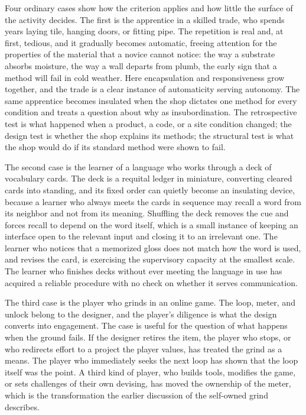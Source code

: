\documentclass[11pt]{article}
\begin{document}
Four ordinary cases show how the criterion applies and how little the surface of the activity decides. The first is the apprentice in a skilled trade, who spends years laying tile, hanging doors, or fitting pipe. The repetition is real and, at first, tedious, and it gradually becomes automatic, freeing attention for the properties of the material that a novice cannot notice: the way a substrate absorbs moisture, the way a wall departs from plumb, the early sign that a method will fail in cold weather. Here encapsulation and responsiveness grow together, and the trade is a clear instance of automaticity serving autonomy. The same apprentice becomes insulated when the shop dictates one method for every condition and treats a question about why as insubordination. The retrospective test is what happened when a product, a code, or a site condition changed; the design test is whether the shop explains its methods; the structural test is what the shop would do if its standard method were shown to fail.

The second case is the learner of a language who works through a deck of vocabulary cards. The deck is a requital ledger in miniature, converting cleared cards into standing, and its fixed order can quietly become an insulating device, because a learner who always meets the cards in sequence may recall a word from its neighbor and not from its meaning. Shuffling the deck removes the cue and forces recall to depend on the word itself, which is a small instance of keeping an interface open to the relevant input and closing it to an irrelevant one. The learner who notices that a memorized gloss does not match how the word is used, and revises the card, is exercising the supervisory capacity at the smallest scale. The learner who finishes decks without ever meeting the language in use has acquired a reliable procedure with no check on whether it serves communication.

The third case is the player who grinds in an online game. The loop, meter, and unlock belong to the designer, and the player's diligence is what the design converts into engagement. The case is useful for the question of what happens when the ground fails. If the designer retires the item, the player who stops, or who redirects effort to a project the player values, has treated the grind as a means. The player who immediately seeks the next loop has shown that the loop itself was the point. A third kind of player, who builds tools, modifies the game, or sets challenges of their own devising, has moved the ownership of the meter, which is the transformation the earlier discussion of the self-owned grind describes.
\end{document}
